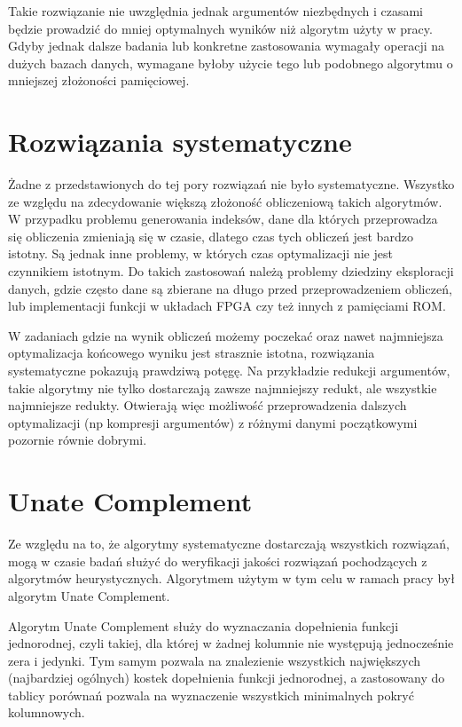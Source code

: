 Takie rozwiązanie nie uwzględnia jednak argumentów niezbędnych i czasami będzie prowadzić do mniej optymalnych wyników niż algorytm użyty w pracy.
Gdyby jednak dalsze badania lub konkretne zastosowania wymagały operacji na dużych bazach danych,
wymagane byłoby użycie tego lub podobnego algorytmu o mniejszej złożoności pamięciowej.

\section{Rozwiązania systematyczne}

Żadne z przedstawionych do tej pory rozwiązań nie było systematyczne.
Wszystko ze względu na zdecydowanie większą złożoność obliczeniową takich algorytmów.
W przypadku problemu generowania indeksów,
dane dla których przeprowadza się obliczenia zmieniają się w czasie,
dlatego czas tych obliczeń jest bardzo istotny.
Są jednak inne problemy,
w których czas optymalizacji nie jest czynnikiem istotnym.
Do takich zastosowań należą problemy dziedziny eksploracji danych,
gdzie często dane są zbierane na długo przed przeprowadzeniem obliczeń,
lub implementacji funkcji w układach FPGA czy też innych z pamięciami ROM.

W zadaniach gdzie na wynik obliczeń możemy poczekać oraz nawet najmniejsza optymalizacja końcowego wyniku jest strasznie istotna,
rozwiązania systematyczne pokazują prawdziwą potęgę.
Na przykładzie redukcji argumentów,
takie algorytmy nie tylko dostarczają zawsze najmniejszy redukt,
ale wszystkie najmniejsze redukty.
Otwierają więc możliwość przeprowadzenia dalszych optymalizacji (np kompresji argumentów) z różnymi danymi początkowymi pozornie równie dobrymi.

\section{Unate Complement}

Ze względu na to,
że algorytmy systematyczne dostarczają wszystkich rozwiązań,
mogą w czasie badań służyć do weryfikacji jakości rozwiązań pochodzących z algorytmów heurystycznych.
Algorytmem użytym w tym celu w ramach pracy był algorytm Unate Complement.

Algorytm Unate Complement służy do wyznaczania dopełnienia funkcji jednorodnej,
czyli takiej,
dla której w żadnej kolumnie nie występują jednocześnie zera i jedynki.
Tym samym pozwala na znalezienie wszystkich największych (najbardziej ogólnych) kostek dopełnienia funkcji jednorodnej,
a zastosowany do tablicy porównań pozwala na wyznaczenie wszystkich minimalnych pokryć kolumnowych.

